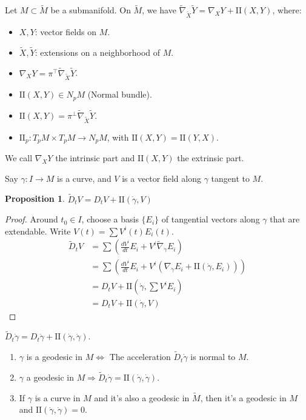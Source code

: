 \documentclass[11pt, a4paper]{article}
\theoremstyle{plain}
\newtheorem{proposition}[theorem]{Proposition}
\theoremstyle{definition}
\theoremstyle{remark}
\begin{document}
{Let $M \subset \tilde{M}$ be a submanifold. On $\tilde{M}$, we have $\tilde{\nabla}_{\tilde{X}} \tilde{Y} = \nabla_X Y + \mathrm{I\!I}(X,Y)$, where:
\begin{itemize}
    \item $X, Y$: vector fields on $M$.
    \item $\tilde{X}, \tilde{Y}$: extensions on a neighborhood of $M$.
    \item $\nabla_X Y = \pi^\top \tilde{\nabla}_{\tilde{X}} \tilde{Y}$.
    \item $\mathrm{I\!I}(X,Y) \in N_p M$ (Normal bundle).
    \item $\mathrm{I\!I}(X,Y) = \pi^\perp \tilde{\nabla}_{\tilde{X}} \tilde{Y}$.
    \item $\mathrm{I\!I}_p: T_pM \times T_pM \to N_pM$, with $\mathrm{I\!I}(X,Y) = \mathrm{I\!I}(Y,X)$.
\end{itemize}
We call $\nabla_X Y$ the intrinsic part and $\mathrm{I\!I}(X,Y)$ the extrinsic part.

Say $\gamma: I \to M$ is a curve, and $V$ is a vector field along $\gamma$ tangent to $M$.
\begin{proposition}
$\tilde{D}_t V = D_t V + \mathrm{I\!I}(\dot{\gamma}, V)$
\end{proposition}
\begin{proof}
Around $t_0 \in I$, choose a basis $\{E_i\}$ of tangential vectors along $\gamma$ that are extendable. Write $V(t) = \sum V^i(t) E_i(t)$.
\begin{align*}
\tilde{D}_t V &= \sum \left( \frac{dV^i}{dt} E_i + V^i \tilde{\nabla}_{\dot{\gamma}} E_i \right) \\
&= \sum \left( \frac{dV^i}{dt} E_i + V^i (\nabla_{\dot{\gamma}} E_i + \mathrm{I\!I}(\dot{\gamma}, E_i)) \right) \\
&= D_t V + \mathrm{I\!I}\left(\dot{\gamma}, \sum V^i E_i\right) \\
&= D_t V + \mathrm{I\!I}(\dot{\gamma}, V)
\end{align*}
\end{proof}

\begin{cor}
$\tilde{D}_t \dot{\gamma} = D_t \dot{\gamma} + \mathrm{I\!I}(\dot{\gamma}, \dot{\gamma})$.
\end{cor}

\begin{cor}
\begin{enumerate}
    \item $\gamma$ is a geodesic in $M \Leftrightarrow$ The acceleration $\tilde{D}_t \dot{\gamma}$ is normal to $M$.
    \item $\gamma$ a geodesic in $M \Rightarrow \tilde{D}_t \dot{\gamma} = \mathrm{I\!I}(\dot{\gamma}, \dot{\gamma})$.
    \item If $\gamma$ is a curve in $M$ and it's also a geodesic in $\tilde{M}$, then it's a geodesic in $M$ and $\mathrm{I\!I}(\dot{\gamma}, \dot{\gamma}) = 0$.
\end{enumerate}
\end{cor}

}
\end{document}
